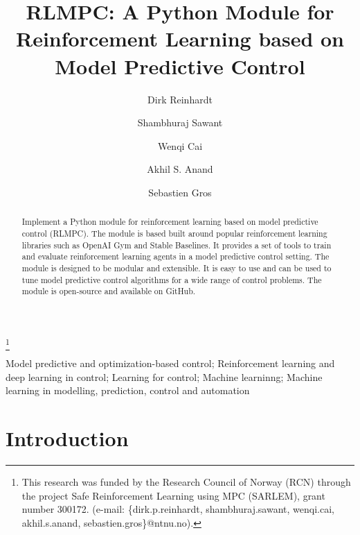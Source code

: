 \documentclass{ifacconf}
\begin{document}
\begin{frontmatter}

   \title{RLMPC: A Python Module for Reinforcement Learning based on Model Predictive Control}

   \thanks[footnoteinfo]{
      This research was funded by the Research Council of Norway
      (RCN) through the project Safe Reinforcement Learning using MPC
      (SARLEM), grant number 300172. (e-mail: \{dirk.p.reinhardt, shambhuraj.sawant, wenqi.cai, akhil.s.anand, sebastien.gros\}@ntnu.no).
   }

   \author[First]{Dirk Reinhardt}
   \author[First]{Shambhuraj Sawant}
   \author[First]{Wenqi Cai}
   \author[First]{Akhil S. Anand}
   \author[First]{Sebastien Gros}

   \address[First]{Department of Engineering Cybernetics, Norwegian University of Science and Technology, Trondheim, Norway}

   \begin{abstract}  %
      Implement a Python module for reinforcement learning based on model predictive control (RLMPC). The module is
      based built around popular reinforcement learning libraries such as OpenAI Gym and Stable Baselines. It
      provides a set of tools to train and evaluate reinforcement learning agents in a model predictive control
      setting. The module is designed to be modular and extensible. It is easy to use and can be used to tune
      model predictive control algorithms for a wide range of control problems. The module is open-source and
      available on GitHub.
   \end{abstract}

   \begin{keyword}
      Model predictive and optimization-based control; Reinforcement learning and deep learning in control; Learning for control; Machine learninng; Machine learning in modelling, prediction, control and automation
   \end{keyword}

\end{frontmatter}


\section{Introduction}
\end{document}
